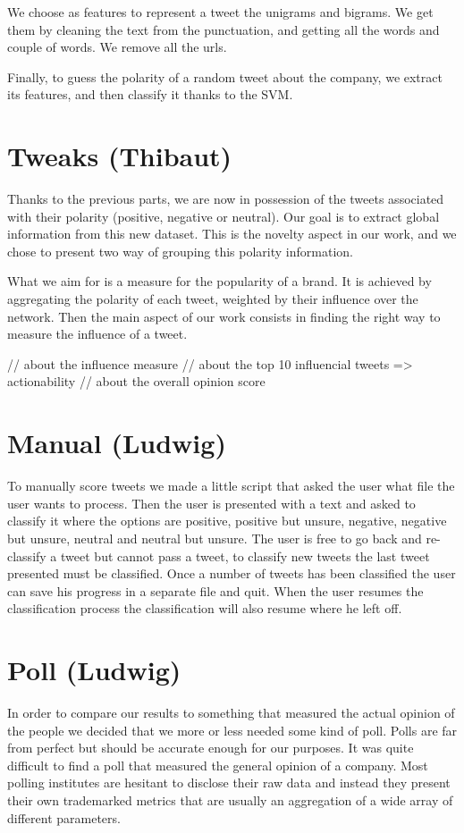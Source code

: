 \documentclass[a4paper,11pt]{report}
\begin{document}
We choose as features to represent a tweet the unigrams and bigrams. We get them by cleaning the text from the punctuation, and getting all the words and couple of words. We remove all the urls.

Finally, to guess the polarity of a random tweet about the company, we extract its features, and then classify it thanks to the SVM.

\section{Tweaks (Thibaut)}

Thanks to the previous parts, we are now in possession of the tweets associated with their polarity (positive, negative or neutral). Our goal is to extract global information from this new dataset.
This is the novelty aspect in our work, and we chose to present two way of grouping this polarity information.

What we aim for is a measure for the popularity of a brand. It is achieved by aggregating the polarity of each tweet, weighted by their influence over the network.
Then the main aspect of our work consists in finding the right way to measure the influence of a tweet.

// about the influence measure
// about the top 10 influencial tweets => actionability
// about the overall opinion score

\section{Manual (Ludwig)}
To manually score tweets we made a little script that asked the user what file the user wants to process. 
Then the user is presented with a text and asked to classify it where the options are positive, positive but unsure, negative, negative but unsure, neutral and neutral but unsure. 
The user is free to go back and re-classify a tweet but cannot pass a tweet, to classify new tweets the last tweet presented must be classified. 
Once a number of tweets has been classified the user can save his progress in a separate file and quit. 
When the user resumes the classification process the classification will also resume where he left off.

\section{Poll (Ludwig)}
In order to compare our results to something that measured the actual opinion of the people we decided that we more or less needed some kind of poll. 
Polls are far from perfect but should be accurate enough for our purposes. It was quite difficult to find a poll that measured the general opinion of a company. 
Most polling institutes are hesitant to disclose their raw data and instead they present their own trademarked metrics that are usually an aggregation of a wide array of different parameters.
\end{document}

